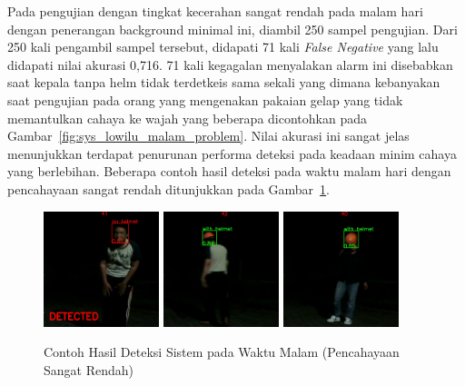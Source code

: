 \par Pada pengujian dengan tingkat kecerahan sangat rendah pada malam hari dengan penerangan background minimal ini, diambil 250 sampel pengujian. Dari 250 kali pengambil sampel tersebut, didapati 71 kali \emph{False Negative} yang lalu didapati nilai akurasi 0,716. 71 kali kegagalan menyalakan alarm ini disebabkan saat kepala tanpa helm tidak terdetkeis sama sekali yang dimana kebanyakan saat pengujian pada orang yang mengenakan pakaian gelap yang tidak memantulkan cahaya ke wajah yang beberapa dicontohkan pada Gambar~\ref{fig:sys_lowilu_malam_problem}. Nilai akurasi ini sangat jelas menunjukkan terdapat penurunan performa deteksi pada keadaan minim cahaya yang berlebihan. Beberapa contoh hasil deteksi pada waktu malam hari dengan pencahayaan sangat rendah ditunjukkan pada Gambar~\ref{fig:sys_lowilu_malam}.

\begin{figure} [h]
    \centering
    \includegraphics[width=0.3\textwidth]{gambar/sistem_gelap/bagus/gelap_alif_ver2 (1).png}
    \includegraphics[width=0.3\textwidth]{gambar/sistem_gelap/bagus/gelap_alif_ver2 (54).png}
    \includegraphics[width=0.3\textwidth]{gambar/sistem_gelap/bagus/gelap_helmika_ver2 (57).png}
    \caption{Contoh Hasil Deteksi Sistem pada Waktu Malam (Pencahayaan Sangat Rendah)}
    \label{fig:sys_lowilu_malam}  
\end{figure}

